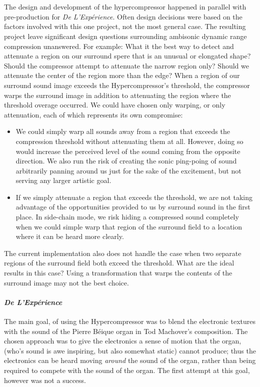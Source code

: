 \section{\thesis}
The design and development of the hypercompressor happened in parallel
with pre-production for \textit{De L'Exp\'{e}rience}. Often design
decisions were based on the factors involved with this one project,
not the most general case. The resulting project leave significant
design questions surrounding ambisonic dynamic range compression
unanswered.  For example: What it the best way to detect and attenuate
a region on our surround spere that is an unusual or elongated shape?
Should the compressor attempt to attenuate the narrow region only?
Should we attenuate the center of the region more than the edge? When
a region of our surround sound image exceeds the Hypercompressor's
threshold, the compressor warps the surround image in addition to
attenuating the region where the threshold overage occurred. We could
have chosen only warping, or only attenuation, each of which
represents its own compromise:
\begin{itemize}
\item We could simply warp all sounds away from a region that exceeds
  the compression threshold without attenuating them at all. However,
  doing so would increase the perceived level of the sound coming from
  the opposite direction. We also run the risk of creating the sonic
  ping-poing of sound arbitrarily panning around us just for the sake
  of the excitement, but not serving any larger artistic goal. 
\item If we simply attenuate a region that exceeds the threshold, we
  are not taking advantage of the opportunities provided to us by
  surround sound in the first place. In side-chain mode, we risk
  hiding a compressed sound completely when we could simple warp that
  region of the surround field to a location where it can be heard
  more clearly.
\end{itemize}
The current implementation also does not handle the case when two
separate regions of the surround field both exceed the threshold. What
are the ideal results in this case? Using a transformation that warps
the contents of the surround image may not the best choice.

\paragraph{\textit{De L'Exp\'{e}rience}}
The main goal, of using the Hypercompressor was to blend the
electronic textures with the sound of the Pierre B\'{e}ique organ in
Tod Machover's composition. The chosen approach was to give the
electronics a sense of motion that the organ, (who's sound is awe
inspiring, but also somewhat static) cannot produce; thus the
electronics can be heard moving \emph{around} the sound of the organ,
rather than being required to compete with the sound of the organ.
The first attempt at this goal, however was not a success.

